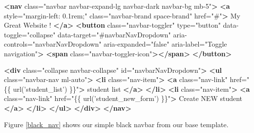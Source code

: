 \documentclass[a4paperpaper,openright]{book}
\newenvironment{Shaded}{}{}
\newcommand{\KeywordTok}[1]{\textcolor[rgb]{0.00,0.44,0.13}{\textbf{#1}}}
\newcommand{\NormalTok}[1]{#1}
\newcommand{\OtherTok}[1]{\textcolor[rgb]{0.00,0.44,0.13}{#1}}
\newcommand{\StringTok}[1]{\textcolor[rgb]{0.25,0.44,0.63}{#1}}
\begin{document}
\begin{Shaded}
\begin{Highlighting}[]
    \KeywordTok{<nav}\OtherTok{ class=}\StringTok{"navbar navbar-expand-lg navbar-dark navbar-bg mb-5"}\KeywordTok{>}
        \KeywordTok{<a}\OtherTok{ style=}\StringTok{"margin-left: 0.1rem;"}\OtherTok{ class=}\StringTok{"navbar-brand space-brand"}\OtherTok{ href=}\StringTok{"#"}\KeywordTok{>}
\NormalTok{            My Great Website !}
        \KeywordTok{</a>}
        \KeywordTok{<button}\OtherTok{ class=}\StringTok{"navbar-toggler"}\OtherTok{ type=}\StringTok{"button"}\OtherTok{ data-toggle=}\StringTok{"collapse"}\OtherTok{ data-target=}\StringTok{"#navbarNavDropdown"}\OtherTok{ aria-controls=}\StringTok{"navbarNavDropdown"}\OtherTok{ aria-expanded=}\StringTok{"false"}\OtherTok{ aria-label=}\StringTok{"Toggle navigation"}\KeywordTok{>}
            \KeywordTok{<span}\OtherTok{ class=}\StringTok{"navbar-toggler-icon"}\KeywordTok{></span>}
        \KeywordTok{</button>}

        \KeywordTok{<div}\OtherTok{ class=}\StringTok{"collapse navbar-collapse"}\OtherTok{ id=}\StringTok{"navbarNavDropdown"}\KeywordTok{>}
            \KeywordTok{<ul}\OtherTok{ class=}\StringTok{"navbar-nav ml-auto"}\KeywordTok{>}
                \KeywordTok{<li}\OtherTok{ class=}\StringTok{"nav-item"}\KeywordTok{>}
                    \KeywordTok{<a}\OtherTok{ class=}\StringTok{"nav-link"}\OtherTok{ href=}\StringTok{"\{\{ url('student_list') \}\}"}\KeywordTok{>}\NormalTok{ student list}
                    \KeywordTok{</a>}
                \KeywordTok{</li>}
                \KeywordTok{<li}\OtherTok{ class=}\StringTok{"nav-item"}\KeywordTok{>}
                    \KeywordTok{<a}\OtherTok{ class=}\StringTok{"nav-link"}\OtherTok{ href=}\StringTok{"\{\{ url('student_new_form') \}\}"}\KeywordTok{>}
\NormalTok{                        Create NEW student}
                    \KeywordTok{</a>}
                \KeywordTok{</li>}
            \KeywordTok{</ul>}
        \KeywordTok{</div>}
    \KeywordTok{</nav>}
\end{Highlighting}
\end{Shaded}

Figure \ref{black_nav} shows our simple black navbar from our base
template.
\end{document}
